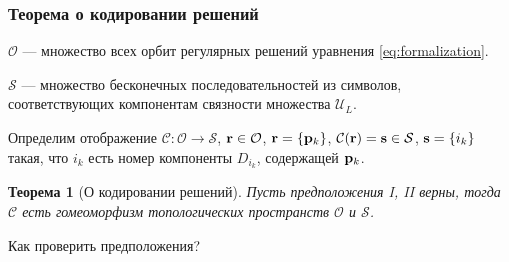 \documentclass [10pt] {beamer}
\newtheorem{thm}{Теорема}
\begin{document}
\begin{frame}
	\frametitle{Теорема о кодировании решений}
	
	$\mathcal{O}$ --- множество всех орбит регулярных решений уравнения \eqref{eq:formalization}.

	\vspace{10pt}

	$\mathcal{S}$ --- множество бесконечных последовательностей из символов, соответствующих компонентам связности множества $\mathscr{U}_L$.
	
	\vspace{10pt}
	
	Определим отображение $\mathcal{C}: \mathcal{O} \to \mathcal{S}$, $\vb{r} \in \mathcal{O}$, $\vb{r} = \{ \vb{p}_k \}$, $\mathcal{C}(\vb{r}) = \vb{s} \in \mathcal{S}$, $\vb{s} = \{ i_k \}$ такая, что $i_k$ есть номер компоненты $D_{i_k}$, содержащей $\vb{p}_k$. 

	\vspace{10pt}
	
	\begin{thm}[О кодировании решений]
		Пусть предположения I, II верны, тогда $\mathcal{C}$ есть гомеоморфизм топологических пространств $\mathcal{O}$ и $\mathcal{S}$.
	\end{thm}
	
	\vspace{10pt}
	
	\begin{center}
		Как проверить предположения?
	\end{center}
\end{frame}
\end{document}
